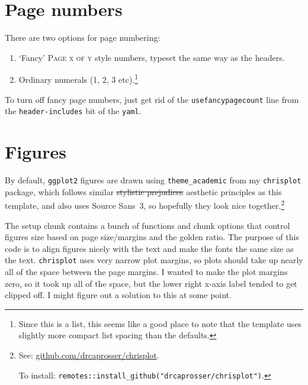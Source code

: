\documentclass[
  a4paper,
  twoside]{article}
\newcommand{\headerdemo}[1]{{\sffamily\scshape\color{black!60}\fontsize{11}{12}\selectfont #1}}
\begin{document}
\section{Page numbers}\label{page-numbers}

There are two options for page numbering:

\begin{enumerate}
\def\labelenumi{\arabic{enumi}.}
\item
  `Fancy' \headerdemo{Page x of y} style numbers, typeset the same way as the headers.
\item
  Ordinary numerals (1, 2, 3 etc).\footnote{Since this is a list, this seems like a good place to note that the template uses slightly more compact list spacing than the defaults.}
\end{enumerate}

To turn off fancy page numbers, just get rid of the \texttt{usefancypagecount} line from the \texttt{header-includes} bit of the \texttt{yaml}.

\section{Figures}\label{figures}

By default, \texttt{ggplot2} figures are drawn using \texttt{theme\_academic} from my \texttt{chrisplot} package, which follows similar \st{stylistic prejudices} aesthetic principles as this template, and also uses \textsf{Source Sans~3}, so hopefully they look nice together.\footnote{See: \href{https://github.com/drcaprosser/chrisplot}{github.com/drcaprosser/chrisplot}.

  To install: \texttt{remotes::install\_github("drcaprosser/chrisplot")}.}

The setup chunk contains a bunch of functions and chunk options that control figures size based on page size/margins and the golden ratio. The purpose of this code is to align figures nicely with the text and make the fonts the same size as the text. \texttt{chrisplot} uses very narrow plot margins, so plots should take up nearly all of the space between the page margins. I wanted to make the plot margins zero, so it took up all of the space, but the lower right x-axis label tended to get clipped off. I might figure out a solution to this at some point.
\end{document}
